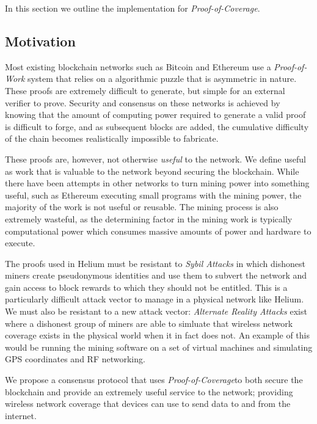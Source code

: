 \documentclass[letterpaper,11pt]{report}
\newcommand{\proofofcoverage}{\textit{Proof-of-Coverage}}
\begin{document}
In this section we outline the implementation for \proofofcoverage.

\subsection{Motivation}

Most existing blockchain networks such as Bitcoin \cite{bitcoin} and Ethereum \cite{ethereum} use a \textit{Proof-of-Work} system that relies on a algorithmic puzzle that is asymmetric in nature. These proofs are extremely difficult to generate, but simple for an external verifier to prove. Security and consensus on these networks is achieved by knowing that the amount of computing power required to generate a valid proof is difficult to forge, and as subsequent blocks are added, the cumulative difficulty of the chain becomes realistically impossible to fabricate. \newline

These proofs are, however, not otherwise \textit{useful} to the network. We define useful as work that is valuable to the network beyond securing the blockchain. While there have been attempts in other networks to turn mining power into something useful, such as Ethereum executing small programs with the mining power, the majority of the work is not useful or reusable. The mining process is also extremely wasteful, as the determining factor in the mining work is typically computational power which consumes massive amounts of power and hardware to execute.\newline

The proofs used in Helium must be resistant to \textit{Sybil Attacks} in which dishonest miners create pseudonymous identities and use them to subvert the network and gain access to block rewards to which they should not be entitled. This is a particularly difficult attack vector to manage in a physical network like Helium. We must also be resistant to a new attack vector: \textit{Alternate Reality Attacks} exist where a dishonest group of miners are able to simluate that wireless network coverage exists in the physical world when it in fact does not. An example of this would be running the mining software on a set of virtual machines and simulating GPS coordinates and RF networking.\newline

We propose a consensus protocol that uses \proofofcoverage to both secure the blockchain and provide an extremely useful service to the network; providing wireless network coverage that devices can use to send data to and from the internet. 
\end{document}
